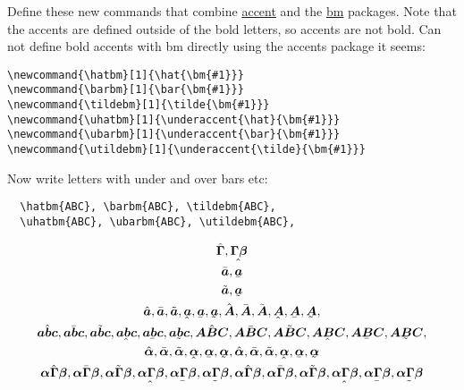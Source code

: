 \documentclass[12pt,english]{article}
\begin{document}
Define these new commands that combine \href{https://ctan.org/pkg/accents?lang=en}{accent} and the \href{https://ctan.org/pkg/bm?lang=en}{bm} packages. Note that the accents are defined outside of the bold letters, so accents are not bold. Can not define bold accents with bm directly using the accents package it seems:

\newcommand{\hatbm}[1]{\hat{\bm{#1}}}
\newcommand{\barbm}[1]{\bar{\bm{#1}}}
\newcommand{\tildebm}[1]{\tilde{\bm{#1}}}
\newcommand{\uhatbm}[1]{\underaccent{\hat}{\bm{#1}}}
\newcommand{\ubarbm}[1]{\underaccent{\bar}{\bm{#1}}}
\newcommand{\utildebm}[1]{\underaccent{\tilde}{\bm{#1}}}
\begin{verbatim}
\newcommand{\hatbm}[1]{\hat{\bm{#1}}}
\newcommand{\barbm}[1]{\bar{\bm{#1}}}
\newcommand{\tildebm}[1]{\tilde{\bm{#1}}}
\newcommand{\uhatbm}[1]{\underaccent{\hat}{\bm{#1}}}
\newcommand{\ubarbm}[1]{\underaccent{\bar}{\bm{#1}}}
\newcommand{\utildebm}[1]{\underaccent{\tilde}{\bm{#1}}}
\end{verbatim}

Now write letters with under and over bars etc:

\begin{verbatim}
  \hatbm{ABC}, \barbm{ABC}, \tildebm{ABC},
  \uhatbm{ABC}, \ubarbm{ABC}, \utildebm{ABC},
\end{verbatim}
\begin{align}
    \begin{gathered}
      \hatbm{\Gamma}, \uhatbm{\Gamma\beta}\\
      \barbm{a}, \ubarbm{a}\\
      \tildebm{a}, \utildebm{a}\\
      \hatbm{a}, \barbm{a}, \tildebm{a}, \uhatbm{a}, \ubarbm{a}, \utildebm{a},
      \hatbm{A}, \barbm{A}, \tildebm{A}, \uhatbm{A}, \ubarbm{A}, \utildebm{A},
      \\
      \hatbm{abc}, \barbm{abc}, \tildebm{abc}, \uhatbm{abc}, \ubarbm{abc}, \utildebm{abc},
      \hatbm{ABC}, \barbm{ABC}, \tildebm{ABC}, \uhatbm{ABC}, \ubarbm{ABC}, \utildebm{ABC},
      \\
      \hatbm{\alpha}, \barbm{\alpha}, \tildebm{\alpha}, \uhatbm{\alpha}, \ubarbm{\alpha}, \utildebm{\alpha},
      \hatbm{\alpha}, \barbm{\alpha}, \tildebm{\alpha}, \uhatbm{\alpha}, \ubarbm{\alpha}, \utildebm{\alpha}\\
      \hatbm{\alpha\Gamma\beta}, \barbm{\alpha\Gamma\beta}, \tildebm{\alpha\Gamma\beta}, \uhatbm{\alpha\Gamma\beta}, \ubarbm{\alpha\Gamma\beta}, \utildebm{\alpha\Gamma\beta},
      \hatbm{\alpha\Gamma\beta}, \barbm{\alpha\Gamma\beta}, \tildebm{\alpha\Gamma\beta}, \uhatbm{\alpha\Gamma\beta}, \ubarbm{\alpha\Gamma\beta}, \utildebm{\alpha\Gamma\beta}\\
    \end{gathered}
\end{align}
\end{document}
